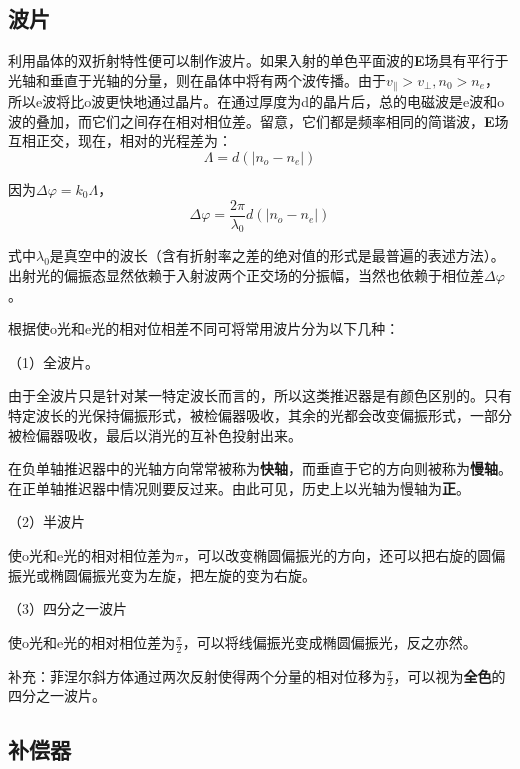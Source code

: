 \documentclass[UTF8]{ctexart}
\newcommand{\backdoc}{\normalsize}
\begin{document}
	\subsection{波片}
	
	\backdoc
	利用晶体的双折射特性便可以制作波片。如果入射的单色平面波的\textbf{E}场具有平行于光轴和垂直于光轴的分量，则在晶体中将有两个波传播。由于$v_{ \|}>v_{\perp}, n_{0}>n_{e}$，所以e波将比o波更快地通过晶片。在通过厚度为d的晶片后，总的电磁波是e波和o波的叠加，而它们之间存在相对相位差。留意，它们都是频率相同的简谐波，\textbf{E}场互相正交，现在，相对的光程差为：
	\begin{equation}
\Lambda=d\left(\left|n_{o}-n_{e}\right|\right)
	\end{equation}
	
	\noindent 因为$\Delta \varphi=k_{0} \Lambda$，
	\begin{equation}
\Delta \varphi=\frac{2 \pi}{\lambda_{0}} d\left(\left|n_{o}-n_{e}\right|\right)
	\end{equation}
	
	\noindent 式中$\lambda_{0}$是真空中的波长（含有折射率之差的绝对值的形式是最普遍的表述方法）。出射光的偏振态显然依赖于入射波两个正交场的分振幅，当然也依赖于相位差$\Delta \varphi$。
	
	根据使o光和e光的相对位相差不同可将常用波片分为以下几种：
	
	（1）全波片。
	
	由于全波片只是针对某一特定波长而言的，所以这类推迟器是有颜色区别的。只有特定波长的光保持偏振形式，被检偏器吸收，其余的光都会改变偏振形式，一部分被检偏器吸收，最后以消光的互补色投射出来。
	
	在负单轴推迟器中的光轴方向常常被称为\textbf{快轴}，而垂直于它的方向则被称为\textbf{慢轴}。在正单轴推迟器中情况则要反过来。由此可见，历史上以光轴为慢轴为\textbf{正}。
	
	（2）半波片
	
	使o光和e光的相对相位差为$\pi$，可以改变椭圆偏振光的方向，还可以把右旋的圆偏振光或椭圆偏振光变为左旋，把左旋的变为右旋。
	
	（3）四分之一波片
	
	使o光和e光的相对相位差为$\frac{\pi}{2}$，可以将线偏振光变成椭圆偏振光，反之亦然。
	
	补充：菲涅尔斜方体通过两次反射使得两个分量的相对位移为$\frac{\pi}{2}$，可以视为\textbf{全色}的四分之一波片。
	
	\subsection{补偿器}
	
\end{document}
